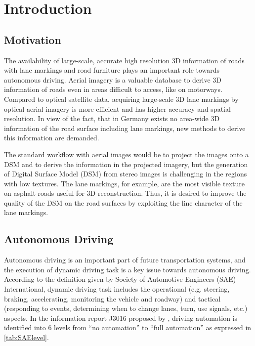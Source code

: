 
\chapter{Introduction}

\section{Motivation}
The availability of large-scale, accurate high resolution 3D information of roads with lane markings and road furniture plays an important role towards autonomous driving. Aerial imagery is a valuable database to derive 3D information of roads even in areas difficult to access, like on motorways. Compared to optical satellite data, acquiring large-scale 3D lane markings by optical aerial imagery is more efficient and has higher accuracy and spatial resolution. In view of the fact, that in Germany exists no area-wide 3D information of the road surface including lane markings, new methods to derive this information are demanded.

The standard workflow with aerial images would be to project the images onto a DSM and to derive the information in the projected imagery, but the generation of Digital Surface Model (DSM) from stereo images is challenging in the regions with low textures. The lane markings, for example, are the most visible texture on asphalt roads useful for 3D reconstruction. Thus, it is desired to improve the quality of the DSM on the road surfaces by exploiting the line character of the lane markings. 


\section{Autonomous Driving}

Autonomous driving is an important part of future transportation systems, and the execution of dynamic driving task is a key issue towards autonomous driving. According to the definition given by Society of Automotive Engineers (SAE) International, dynamic driving task includes the operational (e.g. steering, braking, accelerating, monitoring the vehicle and roadway) and tactical (responding to events, determining when to change lanes, turn, use signals, etc.) aspects. In the information report J3016 \cite{SAE2014} proposed by \citeauthor{SAE2014}, driving automation is identified into 6 levels from “no automation” to “full automation” as expressed in \cref{tab:SAElevel}. 

